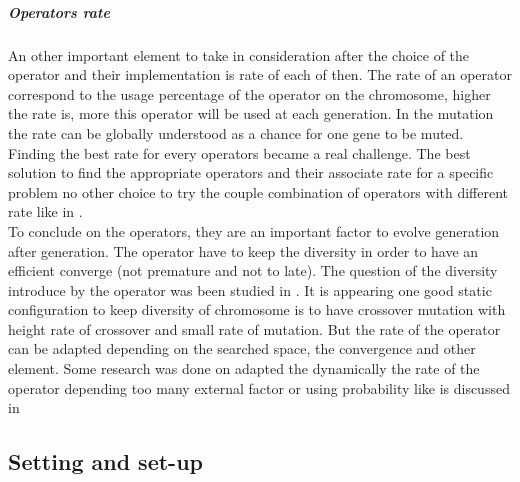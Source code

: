 \subparagraph{Operators rate}
 An other important element to take in consideration after the choice of the operator and their implementation is  rate of each of then. 
The rate of an operator correspond to the usage percentage of the operator on the chromosome, higher the rate is,  more this operator will be used at each generation. 
In the mutation the rate can be globally understood as a chance for one gene to be muted. 
Finding the  best rate for every operators became a real challenge. The best solution to find the appropriate  operators and their associate rate for a specific problem no other choice to try the couple combination of operators with different rate like in \cite{73*wright1991,71*grefenstette1986,133*schwefel1984}.\\

 To conclude on the operators, they are an important factor to evolve generation after generation.  The operator have to keep the diversity  in order to have an efficient converge (not premature and not to late). The question of the diversity introduce by the operator was been studied in  \cite{80*serpell2010,95*miller1995} \cite{113*mais2010}. 
 It is appearing one good static configuration to keep diversity \cite{64*matsui1999} of chromosome is to have crossover mutation with height rate of crossover and small rate of mutation. 
But the rate of the operator can be adapted depending on the searched space, the convergence and other element. Some research was done on adapted the dynamically the rate of the operator depending too many external factor or using probability like is discussed in  \cite{110*eiben2003,133*schwefel1984,94*srinivas1994}


	
\subsection{Setting and  set-up} \label{sec:Setting and  set-up}

